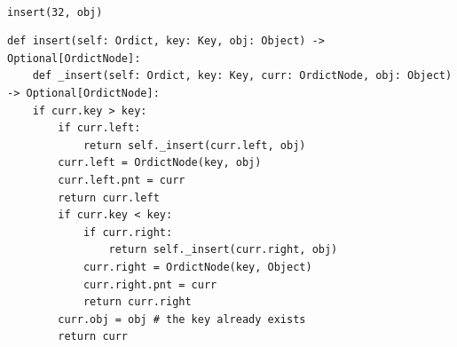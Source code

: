 \documentclass[mathserif, handout]{beamer}
\begin{document}
\begin{frame}
\begin{center}
 \\
\footnotesize\color{gray} \texttt{insert(32, obj)}
\end{center}
\begin{center}
\end{center}
\begin{center}
\footnotesize\color{gray} \;
\end{center}
\end{frame}



\begin{frame}[fragile]
\vspace{-8mm}
\begin{thmboxtop}
\begin{lstlisting}[style=mypython]
def insert(self: Ordict, key: Key, obj: Object) -> Optional[OrdictNode]:
    def _insert(self: Ordict, key: Key, curr: OrdictNode, obj: Object) -> Optional[OrdictNode]:
    if curr.key > key:
        if curr.left:
            return self._insert(curr.left, obj)
        curr.left = OrdictNode(key, obj)
        curr.left.pnt = curr
        return curr.left
        if curr.key < key:
            if curr.right:
                return self._insert(curr.right, obj)
            curr.right = OrdictNode(key, Object)
            curr.right.pnt = curr
            return curr.right
        curr.obj = obj # the key already exists
        return curr
\end{lstlisting}
\end{thmboxtop}
\end{frame}
\end{document}

